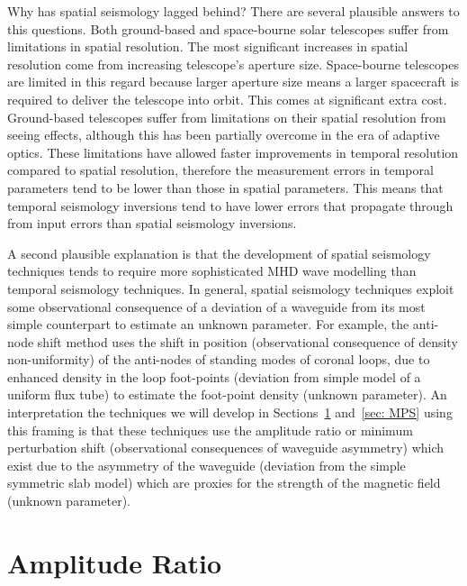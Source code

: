 \documentclass[12pt]{../style-files/ociamthesis}
\begin{document}
Why has spatial seismology lagged behind? There are several plausible answers to this questions. Both ground-based and space-bourne solar telescopes suffer from limitations in spatial resolution. The most significant increases in spatial resolution come from increasing telescope's aperture size. Space-bourne telescopes are limited in this regard because larger aperture size means a larger spacecraft is required to deliver the telescope into orbit. This comes at significant extra cost. Ground-based telescopes suffer from limitations on their spatial resolution from seeing effects, although this has been partially overcome in the era of adaptive optics. These limitations have allowed faster improvements in temporal resolution compared to spatial resolution, therefore the measurement errors in temporal parameters tend to be lower than those in spatial parameters. This means that temporal seismology inversions tend to have lower errors that propagate through from input errors than spatial seismology inversions.

A second plausible explanation is that the development of spatial seismology techniques tends to require more sophisticated MHD wave modelling than temporal seismology techniques. In general, spatial seismology techniques exploit some observational consequence of a deviation of a waveguide from its most simple counterpart to estimate an unknown parameter. For example, the anti-node shift method uses the shift in position (observational consequence of density non-uniformity) of the anti-nodes of standing modes of coronal loops, due to enhanced density in the loop foot-points (deviation from simple model of a uniform flux tube) to estimate the foot-point density (unknown parameter). An interpretation the techniques we will develop in Sections~\ref{sec: AR} and~\ref{sec: MPS} using this framing is that these techniques use the amplitude ratio or minimum perturbation shift (observational consequences of waveguide asymmetry) which exist due to the asymmetry of the waveguide (deviation from the simple symmetric slab model) which are proxies for the strength of the magnetic field (unknown parameter).


\section{Amplitude Ratio}
\label{sec: AR}
\end{document}
